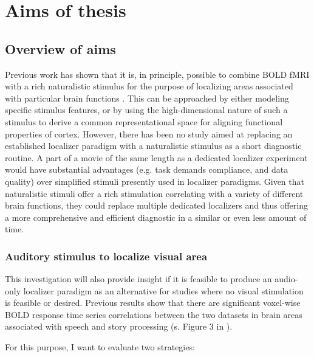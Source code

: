\section{Aims of thesis}


\subsection{Overview of aims}
%
Previous work has shown that it is, in principle, possible to combine BOLD fMRI
with a rich naturalistic stimulus for the purpose of localizing areas associated
with particular brain functions \citep{bartels2004mapping}.
%
This can be approached by either modeling specific stimulus features, or by
using the high-dimensional nature of such a stimulus to derive a common
representational space for aligning functional properties of cortex.
%
However, there has been no study aimed at replacing an established localizer
paradigm with a naturalistic stimulus as a short diagnostic routine.
%
A part of a movie of the same length as a dedicated localizer experiment would
have substantial advantages (e.g. task demands compliance, and data quality)
over simplified stimuli presently used in localizer paradigms.
%
Given that naturalistic stimuli offer a rich stimulation correlating with a
variety of different brain functions, they could replace multiple dedicated
localizers and thus offering a more comprehensive and efficient diagnostic in a
similar or even less amount of time.



\subsubsection{Auditory stimulus to localize visual area}
%
This investigation will also provide insight if it is feasible to produce an
audio-only localizer paradigm as an alternative for studies where no visual
stimulation is feasible or desired.
%
Previous results show that there are significant voxel-wise BOLD response time
series correlations between the two datasets in brain areas associated with
speech and story processing (s. Figure 3 in \citep{hanke2016simultaneous}).

%

For this purpose, I want to evaluate two strategies:

